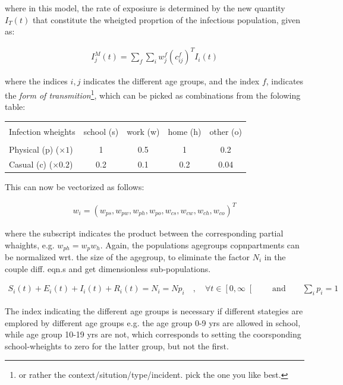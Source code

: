 where in this model, the rate of exposiure is determined by the new quantity $I_{T}(t)$ that constitute the wheigted proprtion of the infectious population, given as:

\begin{align*}
I^{M}_{j}(t) = \sum_{f}\sum_{i}w^{f}_{j}(c^{f}_{ij})^{T}I_{i}(t)
\end{align*}

where the indices $i,j$ indicates the different age groups, and the index $f$, indicates the \textit{form of transmition}\footnote{or rather the context/sitution/type/incident. pick the one you like best.}, which can be picked as combinations from the folowing table:

\begin{table}[H]
\centering
\begin{tabular}{l | *{4}{c}}
\hline \\
Infection wheights & school (s) & work (w) & home (h) & other (o) \\
\hline \\
Physical (p) ($\times 1$)& 1 & 0.5 & 1 & 0.2 \\
Casual (c) ($\times 0.2$) & 0.2 & 0.1 & 0.2 & 0.04
\end{tabular}
\end{table}
This can now be vectorized as follows:

\begin{align*}
w_{i} = (w_{ps}, w_{pw}, w_{ph}, w_{po}, w_{cs}, w_{cw}, w_{ch}, w_{co})^{T}
\end{align*}

where the subscript indicates the product between the corresponding partial whaights, e.g. $w_{ph} = w_{p} w_{h}$.
Again, the populations agegroups copnpartments can be normalized wrt. the size of the agegroup, to eliminate the factor $N_{i}$ in the couple diff. eqn.s and get dimensionless sub-populations.

\begin{align*}
S_{i}(t) + E_{i}(t) + I_{i}(t) + R_{i}(t) = N_{i} = N p_{i} \quad , \quad \forall t \in \left[ 0, \infty \right[ \qquad \text{and} \qquad \sum_{i} p_{i} = 1
\end{align*}

The index indicating the different age groups is necessary if different stategies are emplored by different age groups e.g. the age group 0-9 yrs are allowed in school, while age group 10-19 yrs are not, which corresponds to setting the coorsponding school-wheights to zero for the latter group, but not the first.

